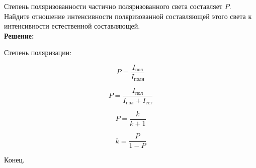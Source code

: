 \documentclass[__main__.tex]{subfiles}
\begin{document}
Степень поляризованности частично поляризованного света составляет $P$. Найдите отношение интенсивности поляризованной составляющей этого света к интенсивности естественной составляющей.\\ 

\textbf{Решение:}

Степень поляризации:

$$P = \frac{I_{пол}}{I_{полн}}$$

$$P = \frac{I_{пол}}{I_{пол} + I_{ест}}$$

$$P = \frac{k}{k + 1}$$

$$k = \frac{P}{1 - P}$$

Конец.
\end{document}
